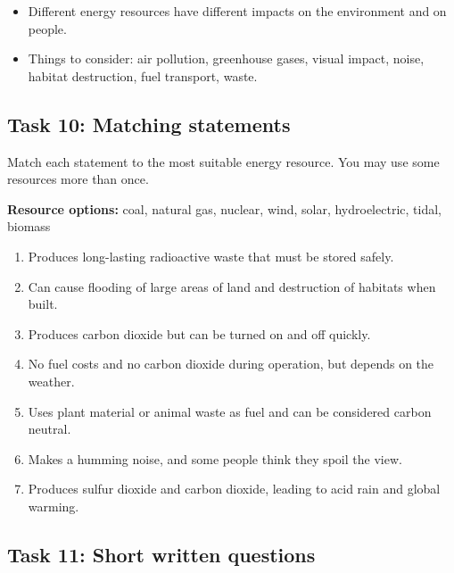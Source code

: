 \documentclass[11pt,a4paper]{article}
\begin{document}
\begin{itemize}[noitemsep]
    \item Different energy resources have different impacts on the environment and on people.
    \item Things to consider: air pollution, greenhouse gases, visual impact, noise, habitat destruction, fuel transport, waste.
\end{itemize}

\subsection*{Task 10: Matching statements}

Match each statement to the most suitable energy resource. You may use some resources more than once.

\textbf{Resource options:} coal, natural gas, nuclear, wind, solar, hydroelectric, tidal, biomass

\begin{enumerate}[label=\arabic*)]
    \item Produces long-lasting radioactive waste that must be stored safely.
    \vspace{0.5cm}
    \item Can cause flooding of large areas of land and destruction of habitats when built.
    \vspace{0.5cm}
    \item Produces carbon dioxide but can be turned on and off quickly.
    \vspace{0.5cm}
    \item No fuel costs and no carbon dioxide during operation, but depends on the weather.
    \vspace{0.5cm}
    \item Uses plant material or animal waste as fuel and can be considered carbon neutral.
    \vspace{0.5cm}
    \item Makes a humming noise, and some people think they spoil the view.
    \vspace{0.5cm}
    \item Produces sulfur dioxide and carbon dioxide, leading to acid rain and global warming.
    \vspace{1cm}
\end{enumerate}

\subsection*{Task 11: Short written questions}
\end{document}
